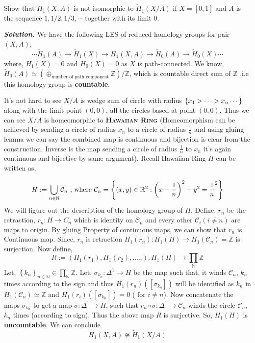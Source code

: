 \documentclass[11pt]{article}
\newcommand{\bb}[1]{\mathbb{#1}}
\newcommand{\N}{\bb{N}}
\newcommand{\Z}{\bb{Z}}
\newcommand{\R}{\mathbb{R}}
\newcommand{\D}{\Delta}
\newcommand{\sol}{ \textbf{\textit{Solution.}} }
\begin{document}
 \begin{prob}{}{}
    Show that $H_{1}(X, A)$ is not isomorphic to $\tilde{H}_{1}(X / A)$ if $X=[0,1]$ and $A$ is the sequence $1,1 / 2,1 / 3, \cdots$ together with its limit $0$.
 \end{prob}

 \sol We have the following LES of reduced homology groups for pair $(X,A)$, 
 \[
   \cdots \tilde{H}_1(A) \to \tilde{H}_1(X) \to {H}_1(X,A) \to \tilde{H}_0(A) \to \tilde{H}_0(X) \cdots 
 \]
where, \(\tilde{H_1(X)}= \qty{0}\) and \(\tilde{H_0(X)} = \qty{0}\) as \(X\) is path-connected. We know, \(\tilde{H}_0(A) \simeq (\oplus_{\text{number of path component}} \Z )/ \Z\), which is countable  direct sum of $\Z$ .i.e this homology group is \textbf{countable}.

\vspace*{0.2cm}

\noindent It's not hard to see $X/A$ is wedge sum of circle with radius $\qty{x_1 > \cdots > x_n \cdots }$ along with the limit point $(0,0)$, all the circles based at point $(0,0)$. Thus we can see $X/A$ is homeomorphic to \textbf{\textsc{Hawaiian Ring}} (Homeomorphism can be achieved by sending a circle of radius $x_n$ to a circle of radius $\frac{1}{n}$ and using gluing lemma we can say the combined map is continuous and bijection is clear from the construction. Inverse is the map sending a circle of radius $\frac{1}{n}$ to $x_n$ it's again continuous and bijective by same argument). Recall Hawaiian Ring $H$ can be written as,

$$H := \bigcup_{n\in \N} \mathcal{C}_n \text{ , where } \mathcal{C}_n = \qty{(x,y) \in \R^2 : \qty(x-\frac{1}{n})^2 +y^2 = \frac{1}{n}^2}$$
\noindent We will figure out the description of the homology group of $H$. Define, $r_n$ be the retraction,
$r_n: H \rightarrow C_n$ which is identity on $\mathcal{C}_n$ and every other $\mathcal{C}_i(i \neq n)$ are maps to origin. By gluing Property of continuous maps, we can show that $r_n$ is Continuous map. Since, $r_n$ is retraction $H_1\left(r_n\right): H_1(H) \rightarrow H_1\left(\mathcal{C}_n\right)=\mathbb{Z}$ is surjection. Now define,
$$
R:=\left(H_1\left(r_1\right), H_1\left(r_2\right), \ldots . .\right): H_1\left(H\right) \longrightarrow \prod_{\mathbb{N}} \mathbb{Z}
$$
Let, \(\left\{k_n\right\}_{n \in \mathbb{N}} \in \prod_{\mathbb{N}} \mathbb{Z}\). Let, $\sigma_{k_n} : \D ^1 \to H$ be the map such that, it winds $\mathcal{C}_n$, $k_n$ times according to the sign and thus $H_1(r_n)([\sigma_{k_n}] )$ will be identified as $k_n$ in $H_1(\mathcal{C}_n) \simeq \Z$ and $H_1(r_i)([\sigma_{k_n}]) = \qty{0}$ ( for $i \neq n$). Now concatenate the maps $\sigma_{k_n}$ to  get a map $\sigma : \D^1 \to H$, such that $r_n \circ \sigma : \D^1 \to \mathcal{C}_n$ winds the circle $\mathcal{C}_n$, $k_n$ times (according to sign). Thus the above map $R$ is surjective. So, $H_1(H)$ is \textbf{uncountable}. We can conclude $$H_1(X,A) \ncong \tilde{H}_1(X/A)$$
\end{document}
